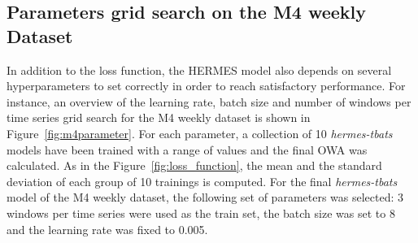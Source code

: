 \documentclass[review]{elsarticle}
\begin{document}
\subsection{Parameters grid search on the M4 weekly Dataset}
\label{sec:m4gridsearch}

In addition to the loss function, the HERMES model also depends on several hyperparameters to set correctly in order to reach satisfactory performance. For instance, an overview of the learning rate, batch size and number of windows per time series grid search for the M4 weekly dataset is shown in Figure~\ref{fig:m4parameter}. For each parameter, a collection of 10 \textit{hermes-tbats} models have been trained with a range of values and the final OWA was calculated. As in the Figure~\ref{fig:loss_function}, the mean and the standard deviation of each group of 10 trainings is computed. For the final \textit{hermes-tbats} model of the M4 weekly dataset,  the following set of parameters was selected: 3 windows per time series were used as the train set, the batch size was set to 8 and the learning rate was fixed to 0.005.
\end{document}
